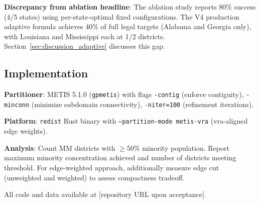 \textbf{Discrepancy from ablation headline}: The ablation study reports 80\% success (4/5 states) using per-state-optimal fixed configurations. The V4 production adaptive formula achieves 40\% of full legal targets (Alabama and Georgia only), with Louisiana and Mississippi each at 1/2 districts. Section~\ref{sec:discussion_adaptive} discusses this gap.

\subsection{Implementation}

\textbf{Partitioner}: METIS 5.1.0 (\texttt{gpmetis}) with flags \texttt{-contig} (enforce contiguity), \texttt{-minconn} (minimize subdomain connectivity), \texttt{-niter=100} (refinement iterations).

\textbf{Platform}: \texttt{redist} Rust binary with \texttt{--partition-mode metis-vra} (vra-aligned edge weights).

\textbf{Analysis}: Count MM districts with $\geq 50\%$ minority population. Report maximum minority concentration achieved and number of districts meeting threshold. For edge-weighted approach, additionally measure edge cut (unweighted and weighted) to assess compactness tradeoff.

All code and data available at [repository URL upon acceptance].
